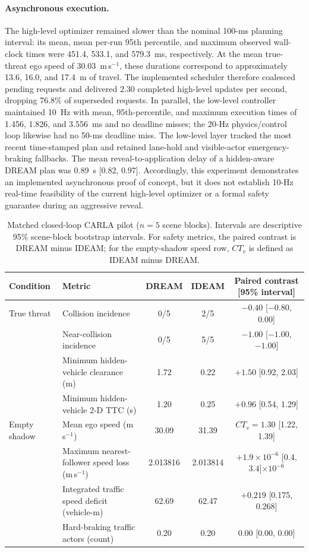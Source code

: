 \paragraph{Asynchronous execution.}
The high-level optimizer remained slower than the nominal 100-ms planning
interval: its mean, mean per-run 95th percentile, and maximum observed
wall-clock times were 451.4, 533.1, and 579.3~ms, respectively.  At the mean
true-threat ego speed of 30.03~m\,s$^{-1}$, these durations correspond to
approximately 13.6, 16.0, and 17.4~m of travel.  The implemented scheduler
therefore coalesced pending requests and delivered 2.30 completed high-level
updates per second, dropping 76.8\% of superseded requests.  In parallel, the
low-level controller maintained 10~Hz with mean, 95th-percentile, and maximum
execution times of 1.456, 1.826, and 3.556~ms and no deadline misses; the
20-Hz physics/control loop likewise had no 50-ms deadline miss.  The low-level
layer tracked the most recent time-stamped plan and retained lane-hold and
visible-actor emergency-braking fallbacks.  The mean reveal-to-application
delay of a hidden-aware DREAM plan was 0.89~s [0.82, 0.97].  Accordingly, this
experiment demonstrates an implemented asynchronous proof of concept, but it
does not establish 10-Hz real-time feasibility of the current high-level
optimizer or a formal safety guarantee during an aggressive reveal.

\begin{table}[t]
\centering
\caption{Matched closed-loop CARLA pilot ($n=5$ scene blocks). Intervals are
descriptive 95\% scene-block bootstrap intervals. For safety metrics, the
paired contrast is DREAM minus IDEAM; for the empty-shadow speed row,
$CT_v$ is defined as IDEAM minus DREAM.}
\label{tab:carla-safety-tradeoff}
\small
\begin{tabular}{llccc}
\toprule
Condition & Metric & DREAM & IDEAM & Paired contrast [95\% interval] \\
\midrule
True threat & Collision incidence & 0/5 & 2/5 & $-0.40$ [$-0.80$, $0.00$] \\
 & Near-collision incidence & 0/5 & 5/5 & $-1.00$ [$-1.00$, $-1.00$] \\
 & Minimum hidden-vehicle clearance (m) & 1.72 & 0.22 & $+1.50$ [0.92, 2.03] \\
 & Minimum hidden-vehicle 2-D TTC (s) & 1.20 & 0.25 & $+0.96$ [0.54, 1.29] \\
\midrule
Empty shadow & Mean ego speed (m\,s$^{-1}$) & 30.09 & 31.39 & $CT_v=1.30$ [1.22, 1.39] \\
 & Maximum nearest-follower speed loss (m\,s$^{-1}$) & 2.013816 & 2.013814 & $+1.9\times10^{-6}$ [$0.4$, $3.4$]$\times10^{-6}$ \\
 & Integrated traffic speed deficit (vehicle-m) & 62.69 & 62.47 & $+0.219$ [0.175, 0.268] \\
 & Hard-braking traffic actors (count) & 0.20 & 0.20 & 0.00 [0.00, 0.00] \\
\bottomrule
\end{tabular}
\end{table}

